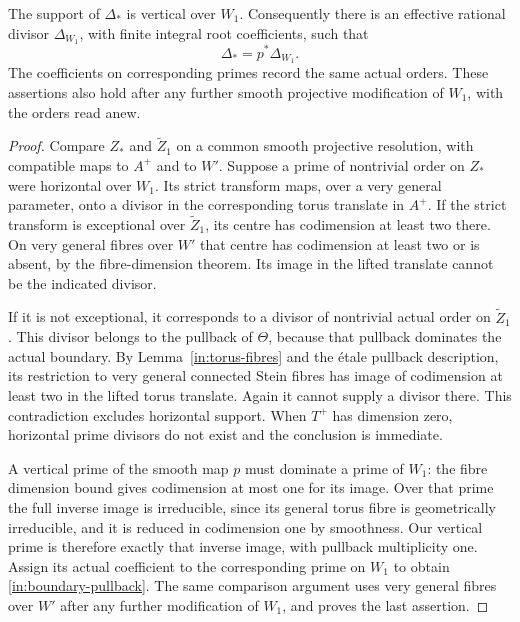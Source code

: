 \begin{lemma}\label{in:vertical-boundary}
The support of $\Delta_*$ is vertical over $W_1$.  Consequently
there is an effective rational divisor $\Delta_{W_1}$, with finite
integral root coefficients, such that
\begin{equation}\label{in:boundary-pullback}
 \Delta_*=p^*\Delta_{W_1}.
\end{equation}
The coefficients on corresponding primes record the same actual
orders.  These assertions also hold after any further smooth
projective modification of $W_1$, with the orders read anew.
\end{lemma}

\begin{proof}
Compare $Z_*$ and $\widetilde Z_1$ on a common smooth projective
resolution, with compatible maps to $A^+$ and to $W'$.  Suppose a
prime of nontrivial order on $Z_*$ were horizontal over $W_1$.
Its strict transform maps, over a very general parameter, onto a
divisor in the corresponding torus translate in $A^+$.  If the
strict transform is exceptional over $\widetilde Z_1$, its centre
has codimension at least two there.  On very general fibres over
$W'$ that centre has codimension at least two or is absent, by the
fibre-dimension theorem.  Its image in the lifted translate cannot
be the indicated divisor.

If it is not exceptional, it corresponds to a divisor of nontrivial
actual order on $\widetilde Z_1$.  This divisor belongs to the
pullback of $\Theta$, because that pullback dominates the actual
boundary.  By Lemma~\ref{in:torus-fibres} and the \'etale pullback
description, its restriction to very general connected Stein fibres
has image of codimension at least two in the lifted torus translate.
Again it cannot supply a divisor there.  This contradiction excludes
horizontal support.  When $T^+$ has dimension zero, horizontal
prime divisors do not exist and the conclusion is immediate.

A vertical prime of the smooth map $p$ must dominate a prime of
$W_1$: the fibre dimension bound gives codimension at most one for
its image.  Over that prime the full inverse image is irreducible,
since its general torus fibre is geometrically irreducible, and it
is reduced in codimension one by smoothness.  Our vertical prime is
therefore exactly that inverse image, with pullback multiplicity
one.  Assign its actual coefficient to the corresponding prime on
$W_1$ to obtain \eqref{in:boundary-pullback}.  The same comparison
argument uses very general fibres over $W'$ after any further
modification of $W_1$, and proves the last assertion.
\end{proof}

